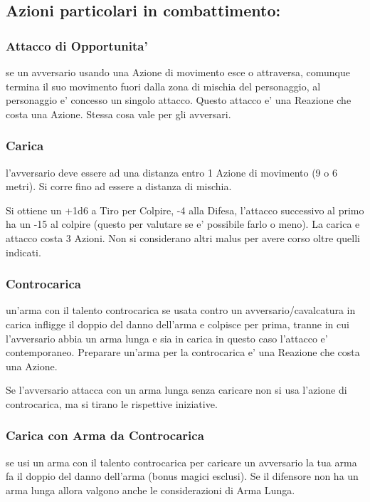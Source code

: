 \documentclass[a4paper,11pt,twoside,openany]{book}
\begin{document}
\subsection{Azioni particolari in combattimento:}

\subsubsection{Attacco di Opportunita'} se un avversario usando una Azione di movimento esce o attraversa, comunque termina il suo movimento fuori dalla zona di mischia del personaggio, al personaggio e' concesso un singolo attacco. Questo attacco e' una Reazione che costa una Azione. Stessa cosa vale per gli avversari.

\subsubsection{Carica} l'avversario deve essere ad una distanza entro 1 Azione di movimento (9 o 6 metri). Si corre fino ad essere a distanza di mischia.

Si ottiene un +1d6 a Tiro per Colpire, -4 alla Difesa, l'attacco successivo al primo ha un -15 al colpire (questo per valutare se e' possibile farlo o meno). La carica e attacco costa 3 Azioni. Non si considerano altri malus per avere corso oltre quelli indicati.

\subsubsection{Controcarica} un'arma con il talento controcarica se usata contro un avversario/cavalcatura in carica infligge il doppio del danno dell'arma e colpisce per prima, tranne in cui l'avversario abbia un arma lunga e sia in carica in questo caso l'attacco e' contemporaneo. Preparare un'arma per la controcarica e' una Reazione che costa una Azione.

Se l'avversario attacca con un arma lunga senza caricare non si usa
l'azione di controcarica, ma si tirano le rispettive iniziative.

\subsubsection{Carica con Arma da Controcarica} se usi un arma con il talento controcarica per caricare un avversario la tua arma fa il doppio del danno dell'arma (bonus magici esclusi). Se il difensore non ha un arma lunga allora valgono anche le considerazioni di Arma Lunga.
\end{document}
